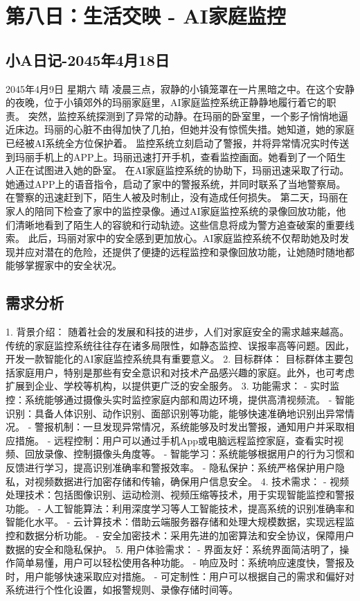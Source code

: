 \section{第八日：生活交映 - AI家庭监控}
\subsection{小A日记-2045年4月18日}
2045年4月9日 星期六 晴
凌晨三点，寂静的小镇笼罩在一片黑暗之中。在这个安静的夜晚，位于小镇郊外的玛丽家庭里，AI家庭监控系统正静静地履行着它的职责。
突然，监控系统探测到了异常的动静。在玛丽的卧室里，一个影子悄悄地逼近床边。玛丽的心脏不由得加快了几拍，但她并没有惊慌失措。她知道，她的家庭已经被AI系统全方位保护着。
监控系统立刻启动了警报，并将异常情况实时传送到玛丽手机上的APP上。玛丽迅速打开手机，查看监控画面。她看到了一个陌生人正在试图进入她的卧室。
在AI家庭监控系统的协助下，玛丽迅速采取了行动。她通过APP上的语音指令，启动了家中的警报系统，并同时联系了当地警察局。在警察的迅速赶到下，陌生人被及时制止，没有造成任何损失。
第二天，玛丽在家人的陪同下检查了家中的监控录像。通过AI家庭监控系统的录像回放功能，他们清晰地看到了陌生人的容貌和行动轨迹。这些信息将成为警方追查破案的重要线索。
此后，玛丽对家中的安全感到更加放心。AI家庭监控系统不仅帮助她及时发现并应对潜在的危险，还提供了便捷的远程监控和录像回放功能，让她随时随地都能够掌握家中的安全状况。
\subsection{需求分析}
1. 背景介绍：
随着社会的发展和科技的进步，人们对家庭安全的需求越来越高。传统的家庭监控系统往往存在诸多局限性，如静态监控、误报率高等问题。因此，开发一款智能化的AI家庭监控系统具有重要意义。
2. 目标群体：
目标群体主要包括家庭用户，特别是那些有安全意识和对技术产品感兴趣的家庭。此外，也可考虑扩展到企业、学校等机构，以提供更广泛的安全服务。
3. 功能需求：
- 实时监控：系统能够通过摄像头实时监控家庭内部和周边环境，提供高清视频流。
- 智能识别：具备人体识别、动作识别、面部识别等功能，能够快速准确地识别出异常情况。
- 警报机制：一旦发现异常情况，系统能够及时发出警报，通知用户并采取相应措施。
- 远程控制：用户可以通过手机App或电脑远程监控家庭，查看实时视频、回放录像、控制摄像头角度等。
- 智能学习：系统能够根据用户的行为习惯和反馈进行学习，提高识别准确率和警报效率。
- 隐私保护：系统严格保护用户隐私，对视频数据进行加密存储和传输，确保用户信息安全。
4. 技术需求：
- 视频处理技术：包括图像识别、运动检测、视频压缩等技术，用于实现智能监控和警报功能。
- 人工智能算法：利用深度学习等人工智能技术，提高系统的识别准确率和智能化水平。
- 云计算技术：借助云端服务器存储和处理大规模数据，实现远程监控和数据分析功能。
- 安全加密技术：采用先进的加密算法和安全协议，保障用户数据的安全和隐私保护。
5. 用户体验需求：
- 界面友好：系统界面简洁明了，操作简单易懂，用户可以轻松使用各种功能。
- 响应及时：系统响应速度快，警报及时，用户能够快速采取应对措施。
- 可定制性：用户可以根据自己的需求和偏好对系统进行个性化设置，如报警规则、录像存储时间等。
